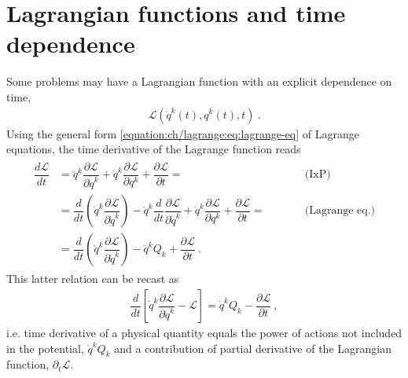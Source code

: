 \documentclass[letterpaper,10pt,english]{jupyterBook}
\begin{document}
\section{Lagrangian functions and time dependence}
\label{\detokenize{ch/lagrange-t:lagrangian-functions-and-time-dependence}}\label{\detokenize{ch/lagrange-t:classical-mechanics-lagrange-time}}\label{\detokenize{ch/lagrange-t::doc}}
\sphinxAtStartPar
Some problems may have a Lagrangian function with an explicit dependence on time,
\begin{equation*}
\begin{split}\mathscr{L}(\dot{q}^k(t),q^k(t),t) \ .\end{split}
\end{equation*}
\sphinxAtStartPar
Using the general form \eqref{equation:ch/lagrange:eq:lagrange-eq} of Lagrange equations, the time derivative of the Lagrange function reads
\begin{equation*}
\begin{split}\begin{aligned}
\dfrac{d \mathscr{L}}{dt}
 & =
  \ddot{q}^k \dfrac{\partial \mathscr{L}}{\partial \dot{q}^k}
 + \dot{q}^k \dfrac{\partial \mathscr{L}}{\partial       q^k}
 + \dfrac{\partial \mathscr{L}}{\partial  t} = && \qquad \text{(IxP)} \\
 & = \dfrac{d}{dt} \left( \dot{q}^k \dfrac{\partial \mathscr{L}}{\partial \dot{q}^k} \right) - \dot{q}^k \dfrac{d}{dt} \dfrac{\partial \mathscr{L}}{\partial \dot{q}^k}
 + \dot{q}^k \dfrac{\partial \mathscr{L}}{\partial       q^k}
 + \dfrac{\partial \mathscr{L}}{\partial  t} = && \qquad \text{(Lagrange eq.)} \\
 & = \dfrac{d}{dt} \left( \dot{q}^k \dfrac{\partial \mathscr{L}}{\partial \dot{q}^k} \right) - \dot{q}^k Q_k
 + \dfrac{\partial \mathscr{L}}{\partial  t} \ .
\end{aligned}\end{split}
\end{equation*}
\sphinxAtStartPar
This latter relation can be recast as
\begin{equation}\label{equation:ch/lagrange-t:eq:euler-beltrami}
\begin{split}\dfrac{d}{dt} \left[ \dot{q}^k \dfrac{\partial \mathscr{L}}{\partial \dot{q}^k} - \mathscr{L} \right] = \dot{q}^k Q_k - \dfrac{\partial \mathscr{L}}{\partial t} \ ,\end{split}
\end{equation}
\sphinxAtStartPar
i.e. time derivative of a physical quantity equals the power of actions not included in the potential, \(\dot{q}^k Q_k\) and a contribution of partial derivative of the Lagrangian function, \(\partial_t \mathscr{L}\).
\end{document}
